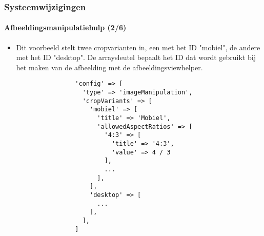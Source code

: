 
\begin{frame}[fragile]
	\frametitle{Systeemwijzigingen}
	\framesubtitle{Afbeeldingsmanipulatiehulp (2/6)}

	\lstset{basicstyle=\tiny\ttfamily}

	\begin{itemize}

		\item Dit voorbeeld stelt twee cropvarianten in, een met
		 	het ID "mobiel", de andere met het ID "desktop".
		 	De arraysleutel bepaalt het ID dat wordt gebruikt bij
		 	het maken van de afbeelding met de afbeeldingsviewhelper.

			\begin{lstlisting}
				'config' => [
				  'type' => 'imageManipulation',
				  'cropVariants' => [
				    'mobiel' => [
				      'title' => 'Mobiel',
				      'allowedAspectRatios' => [
				        '4:3' => [
				          'title' => '4:3',
				          'value' => 4 / 3
				        ],
				        ...
				      ],
				    ],
				    'desktop' => [
				      ...
				    ],
				  ],
				]
			\end{lstlisting}

	\end{itemize}

\end{frame}


